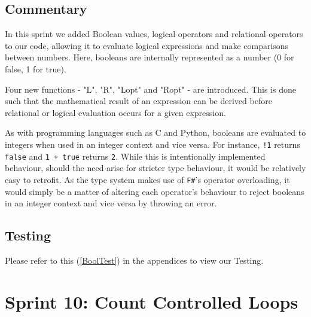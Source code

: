 \documentclass[a4paper, oneside, 11pt]{report}
\begin{document}
\subsection{Commentary}
In this sprint we added Boolean values, logical operators and relational operators to our code, allowing it to evaluate logical expressions and make comparisons between numbers. 
Here, booleans are internally represented as a number (0 for false, 1 for true).

Four new functions - "L", "R", "Lopt" and "Ropt" - are introduced. 
This is done such that the mathematical result of an expression can be derived before relational or logical evaluation occurs for a given expression.

As with programming languages such as C and Python, booleans are evaluated to integers when used in an integer context and vice versa.
For instance, \verb|!1| returns \verb|false| and \verb|1 + true| returns \verb|2|.
While this is intentionally implemented behaviour, should the need arise for stricter type behaviour, it would be relatively easy to retrofit.
As the type system makes use of \verb|F#|'s operator overloading, it would simply be a matter of altering each operator's behaviour to reject booleans in an integer context and vice versa by throwing an error.

\subsection{Testing}
Please refer to this (\ref{BoolTest}) in the appendices to view our Testing. \\

\section{Sprint 10: Count Controlled Loops}
\end{document}
